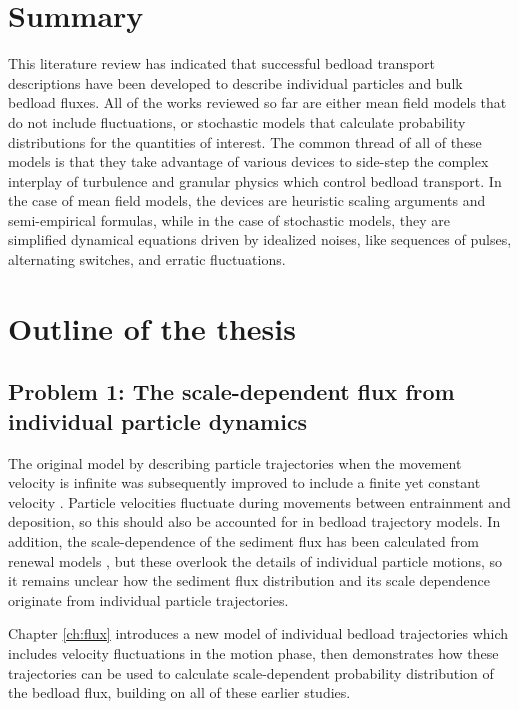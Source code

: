 \section{Summary}

This literature review has indicated that successful bedload transport descriptions have been developed to describe individual particles and bulk bedload fluxes.
All of the works reviewed so far are either mean field models that do not include fluctuations, or stochastic models that calculate probability distributions for the quantities of interest.
The common thread of all of these models is that they take advantage of various devices to side-step the complex interplay of turbulence and granular physics which control bedload transport.
In the case of mean field models, the devices are heuristic scaling arguments and semi-empirical formulas, while in the case of stochastic models, they are simplified dynamical equations driven by idealized noises, like sequences of pulses, alternating switches, and erratic fluctuations.

\section{Outline of the thesis}
\subsection{Problem 1: The scale-dependent flux from individual particle dynamics}

The original model by \citet{Einstein1937} describing particle trajectories when the movement velocity is infinite was subsequently improved to include a finite yet constant velocity \citep{Gordon1972,Lisle1998,Lajeunesse2017}.
Particle velocities fluctuate during movements between entrainment and deposition, so this should also be accounted for in bedload trajectory models.
In addition, the scale-dependence of the sediment flux has been calculated from renewal models \citep{Turowski2010,Ancey2020}, but these overlook the details of individual particle motions, so it remains unclear how the sediment flux distribution and its scale dependence originate from individual particle trajectories.

Chapter \ref{ch:flux} introduces a new model of individual bedload trajectories which includes velocity fluctuations in the motion phase, then demonstrates how these trajectories can be used to calculate scale-dependent probability distribution of the bedload flux, building on all of these earlier studies.

